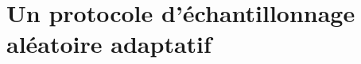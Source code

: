 
\chapter{Un protocole d'échantillonnage aléatoire adaptatif}
\label{net:chap:spray}
\minitoc















